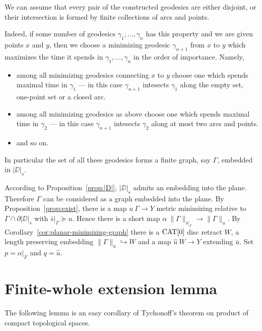 \documentclass{article}
\begin{document}
We can assume that 
every pair of the constructed geodesics 
are either disjoint, or their intersection is formed by finite collections of arcs and points.

Indeed, if some number of geodesics $\gamma_1,\dots,\gamma_n$ has this property and we are given points $x$ and $y$, then
we choose a minimizing geodesic $\gamma_{n+1}$ from $x$ to $y$ which maximizes the time it spends in $\gamma_1,\dots,\gamma_n$  in the order of importance.
Namely, 
\begin{itemize}
\item  among all minimizing geodesics connecting $x$ to $y$
choose one which spends maximal time in $\gamma_1$ --- in this case $\gamma_{n+1}$ intesects $\gamma_1$ along the empty set, one-point set or a closed arc.
\item among all minimizing geodesics as above
choose one which spends maximal time in $\gamma_2$ --- in this case $\gamma_{n+1}$ intesects $\gamma_2$ along at most two arcs and points.
\item and so on.
\end{itemize}


In particular the set of all these geodesics forms a finite graph, say $\Gamma$,
embedded in $|\DD|_s$. 

According to Proposition~\ref{prop:|D|},
$|\DD|_s$ admits an embedding into the plane.
Therefore $\Gamma$ can be considered as a graph embedded into the plane.
By Proposition~\ref{prop:exist}, there is a map $u\:\Gamma\to Y$ metric minimizing relative to $\Gamma\cap\partial|\DD|_{\bar s}$ with
$\bar s|_\Gamma\succcurlyeq u$.
Hence there is a short map $\alpha\:\|\Gamma\|_{\bar s|_\Gamma}\to\|\Gamma\|_u$. 
By Corollary~\ref{cor:planar-minimizing-graph} there is a $\mathop{\rm CAT}\nolimits[0]$ disc retract $W$, a length preserving embedding
$\|\Gamma\|_u\hookrightarrow W$ and a map $\hat u\:W\to Y$ extending $\bar u$. %
Set $p=\alpha|_F$ and $q=\hat u$.
\qeds

\section{Finite-whole extension lemma}\label{Finite-whole extension lemma}

The following lemma is an easy corollary of Tychonoff's theorem on product of compact topological spaces.
\end{document}
